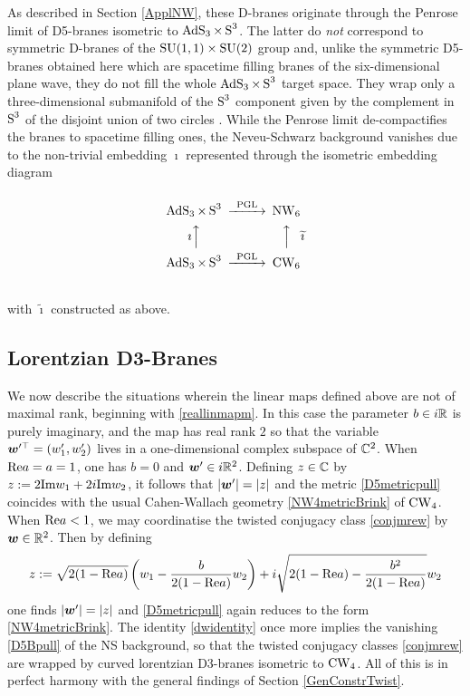 As described in Section \ref{ApplNW}, these D-branes originate through the
Penrose limit of D5-branes isometric to $\AdS_3\times\S^3$. The latter do {\it
  not} correspond to symmetric D-branes of the ${\rm SU}(1,1)\times{\rm SU}(2)$
group and, unlike the symmetric D5-branes obtained here which are spacetime
filling branes of the six-dimensional plane wave, they do not fill the whole
$\AdS_3\times\S^3$ target space. They wrap only a three-dimensional submanifold
of the $\S^3$ component given by the complement in $\S^3$ of the disjoint union
of two circles \cite{Stanciu3}. While the Penrose limit de-compactifies the
branes to spacetime filling ones, the Neveu-Schwarz background vanishes due to
the non-trivial embedding $\imath$ represented through the isometric embedding
diagram
\begin{equation}
  \label{CW6commdiag}
  \begin{CD}
   @.\\
    \AdS_3 \times \S^3             @>\text{PGL}>> \NW_6\\
    \text{$\imath$}   @AAA @AAA\text{$\widetilde{\imath}$} \\
    \AdS_3 \times \S^3             @>\text{PGL}>> \CW_6\\
   @.
  \end{CD}
\end{equation}
with $\widetilde{\imath}$ constructed as above.

\subsection{Lorentzian D3-Branes}
\label{LorD3}
We now describe the situations wherein the linear maps defined above are not of
maximal rank, beginning with \eqref{reallinmapm}. In this case the parameter
$b\in i\R$ is purely imaginary, and the map has real rank $2$ so that the
variable $\mw^{\prime \top}=(w_1',w_2')$ lives in a one-dimensional complex
subspace of $\C^2$. When ${\rm Re} a=a=1$, one has $b=0$ and $\mw'\in
i\R^2$. Defining $z\in\C$ by $z:=2 {\rm Im} w_1+2 i {\rm Im} w_2$, it
follows that $|\mw' |=|z|$ and the metric \eqref{D5metricpull} coincides with
the usual Cahen-Wallach geometry \eqref{NW4metricBrink} of $\CW_4$. When ${\rm
  Re} a<1$, we may coordinatise the twisted conjugacy class \eqref{conjmrew} by
$\mw\in\R^2$. Then by defining
\begin{equation}
  \label{zD3def}
  z:=\sqrt{2(1-{\rm Re} a)} \left(w_1- \frac b{2(1-{\rm Re} a)} 
    w_2\right)+ i\sqrt{2(1-{\rm Re} a)- \frac{b^2} {2(1-{\rm Re} a)} } w_2
\end{equation}
one finds $|\mw' |=|z|$ and \eqref{D5metricpull} again reduces to the form
\eqref{NW4metricBrink}. The identity \eqref{dwidentity} once more implies the
vanishing \eqref{D5Bpull} of the NS background, so that the twisted conjugacy
classes \eqref{conjmrew} are wrapped by curved lorentzian D3-branes isometric to
$\CW_4$. All of this is in perfect harmony with the general findings of Section
\ref{GenConstrTwist}.

